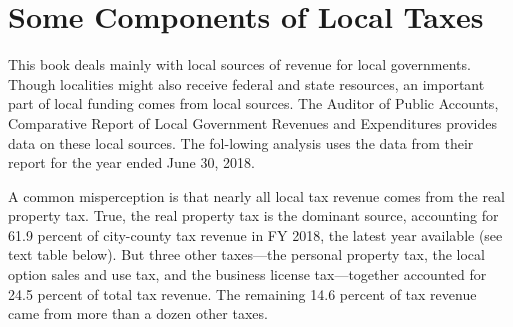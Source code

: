 \documentclass[
]{book}
\begin{document}
\hypertarget{some-components-of-local-taxes}{%
\section{Some Components of Local Taxes}\label{some-components-of-local-taxes}}

This book deals mainly with local sources of revenue for local governments. Though localities might also receive federal and state resources, an important part of local funding comes from local sources. The Auditor of Public Accounts, Comparative Report of Local Government Revenues and Expenditures provides data on these local sources. The fol-lowing analysis uses the data from their report for the year ended June 30, 2018.

A common misperception is that nearly all local tax revenue comes from the real property tax. True, the real property tax is the dominant source, accounting for 61.9 percent of city-county tax revenue in FY 2018, the latest year available (see text table below). But three other taxes---the personal property tax, the local option sales and use tax, and the business license tax---together accounted for 24.5 percent of total tax revenue. The remaining 14.6 percent of tax revenue came from more than a dozen other taxes.
\end{document}

